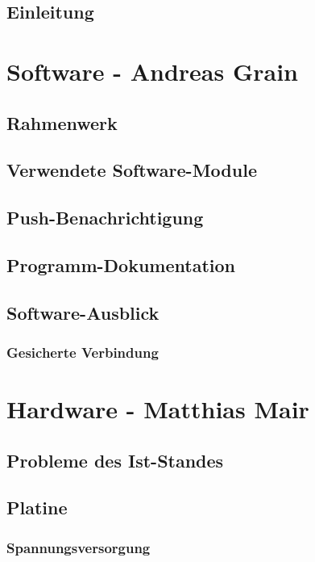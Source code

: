 \documentclass[a4paper, 12pt, twoside, openright
]{memoir}
\newcommand{\AndreasGrain}{Andreas Grain}
\newcommand{\MatthiasMair}{Matthias Mair}
\newcommand{\authorName}{\AndreasGrain\ / \MatthiasMair}
\begin{document}
\mainmatter
\chapter{Einleitung}

\cleartoverso

\renewcommand{\authorName}{\AndreasGrain}
\part{Software - \AndreasGrain}
\chapter{Rahmenwerk}

\chapter{Verwendete Software-Module}

\chapter{Push-Benachrichtigung}
\label{ch:push}

\chapter{Programm-Dokumentation}

\chapter{Software-Ausblick}
\section{Gesicherte Verbindung}%
\cleartoverso

\renewcommand{\authorName}{\MatthiasMair}
\part{Hardware - \MatthiasMair}
\chapter{Probleme des Ist-Standes}
\chapter{Platine}
\section{Spannungsversorgung}
\end{document}
